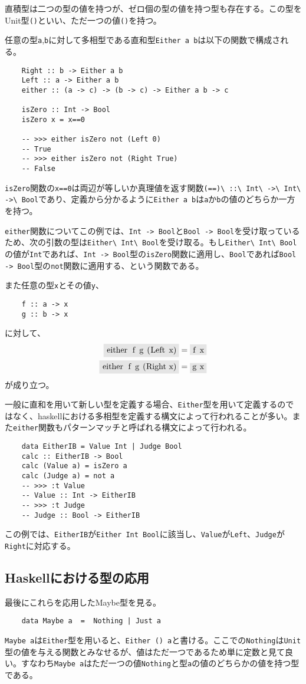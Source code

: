 \documentclass[uplatex,dvipdfmx]{jsarticle}
\newcommand{\pr}[1]{\colorbox[rgb]{0.9,0.9,0.9}{\lstinline{#1}}}
\newcommand{\functype}[2]{\pr{#1 -> #2}}
\begin{document}
  直積型は二つの型の値を持つが、ゼロ個の型の値を持つ型も存在する。この型をUnit型\pr{()}といい、ただ一つの値\pr{()}を持つ。

  任意の型\pr{a},\pr{b}に対して多相型である直和型\pr{Either a b}は以下の関数で構成される。
  \begin{lstlisting}
    Right :: b -> Either a b
    Left :: a -> Either a b
    either :: (a -> c) -> (b -> c) -> Either a b -> c

    isZero :: Int -> Bool
    isZero x = x==0

    -- >>> either isZero not (Left 0)
    -- True
    -- >>> either isZero not (Right True)
    -- False
  \end{lstlisting}
  \pr{isZero}関数の\pr{x==0}は両辺が等しいか真理値を返す関数\pr{(==)\ ::\ Int\ ->\ Int\ ->\ Bool}であり、定義から分かるように\pr{Either a b}は\pr{a}か\pr{b}の値のどちらか一方を持つ。

  \pr{either}関数についてこの例では、\functype{Int}{Bool}と\functype{Bool}{Bool}を受け取っているため、次の引数の型は\pr{Either\ Int\ Bool}を受け取る。もし\pr{Either\ Int\ Bool}の値が\pr{Int}であれば、\functype{Int}{Bool}型の\pr{isZero}関数に適用し、\pr{Bool}であれば\functype{Bool}{Bool}型の\pr{not}関数に適用する、という関数である。

  また任意の型\pr{x}とその値\pr{y}、
  \begin{lstlisting}
    f :: a -> x
    g :: b -> x
  \end{lstlisting}に対して、
  \begin{align*}
    \pr{either f g (Left x)}&=\pr{f x}\\
    \pr{either f g (Right x)}&=\pr{g x}
  \end{align*}
  が成り立つ。

  一般に直和を用いて新しい型を定義する場合、\pr{Either}型を用いて定義するのではなく、haskellにおける多相型を定義する構文によって行われることが多い。また\pr{either}関数もパターンマッチと呼ばれる構文によって行われる。

  \begin{lstlisting}
    data EitherIB = Value Int | Judge Bool
    calc :: EitherIB -> Bool
    calc (Value a) = isZero a
    calc (Judge a) = not a
    -- >>> :t Value
    -- Value :: Int -> EitherIB
    -- >>> :t Judge
    -- Judge :: Bool -> EitherIB
  \end{lstlisting}
  この例では、\pr{EitherIB}が\pr{Either Int Bool}に該当し、\pr{Value}が\pr{Left}、\pr{Judge}が\pr{Right}に対応する。
  \subsection{Haskellにおける型の応用}
  最後にこれらを応用したMaybe型を見る。
  \begin{lstlisting}
    data Maybe a  =  Nothing | Just a
  \end{lstlisting}
  \pr{Maybe a}は\pr{Either}型を用いると、\pr{Either () a}と書ける。ここでの\pr{Nothing}は\pr{Unit}型の値を与える関数とみなせるが、値はただ一つであるため単に定数と見て良い。すなわち\pr{Maybe a}はただ一つの値\pr{Nothing}と型\pr{a}の値のどちらかの値を持つ型である。
\end{document}
